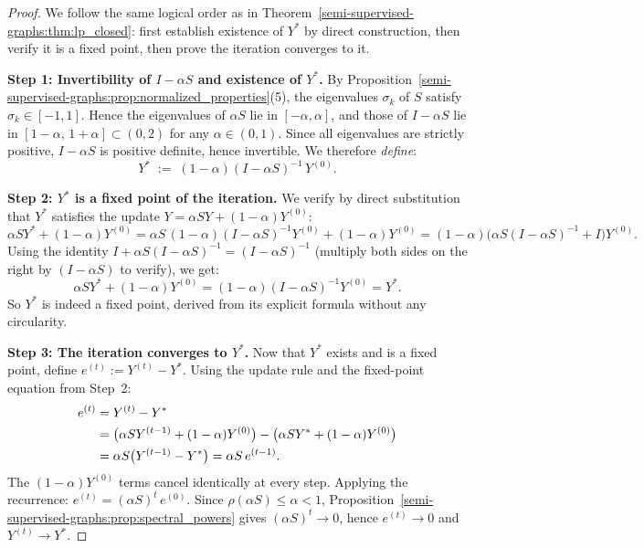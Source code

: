 \begin{notechapter}
\begin{proof}
We follow the same logical order as in Theorem~\ref{semi-supervised-graphs:thm:lp_closed}: first
establish existence of $Y^*$ by direct construction, then verify it is a fixed
point, then prove the iteration converges to it.
\vspace{0.5em}

\textbf{Step 1: Invertibility of $I - \alpha S$ and existence of $Y^*$.}
By Proposition~\ref{semi-supervised-graphs:prop:normalized_properties}(5), the eigenvalues $\sigma_k$
of $S$ satisfy $\sigma_k \in [-1, 1]$. Hence the eigenvalues of $\alpha S$ lie
in $[-\alpha, \alpha]$, and those of $I - \alpha S$ lie in
$[1-\alpha,\, 1+\alpha] \subset (0, 2)$ for any $\alpha \in (0,1)$. Since all
eigenvalues are strictly positive, $I - \alpha S$ is positive definite, hence
invertible. We therefore \emph{define}:
\[
  Y^* \;:=\; (1-\alpha)(I - \alpha S)^{-1}\,Y^{(0)}.
\]

\textbf{Step 2: $Y^*$ is a fixed point of the iteration.}
We verify by direct substitution that $Y^*$ satisfies the update
$Y = \alpha S Y + (1-\alpha)Y^{(0)}$:
\[
  \alpha S Y^* + (1-\alpha)Y^{(0)}
  = \alpha S\,(1-\alpha)(I-\alpha S)^{-1}Y^{(0)} + (1-\alpha)Y^{(0)}
  = (1-\alpha)\bigl(\alpha S(I-\alpha S)^{-1} + I\bigr)Y^{(0)}.
\]
Using the identity $I + \alpha S(I - \alpha S)^{-1} = (I - \alpha S)^{-1}$
(multiply both sides on the right by $(I - \alpha S)$ to verify), we get:
\[
  \alpha S Y^* + (1-\alpha)Y^{(0)}
  = (1-\alpha)(I - \alpha S)^{-1}Y^{(0)} = Y^*.
\]
So $Y^*$ is indeed a fixed point, derived from its explicit formula without
any circularity.

\textbf{Step 3: The iteration converges to $Y^*$.}
Now that $Y^*$ exists and is a fixed point, define $e^{(t)} := Y^{(t)} - Y^*$.
Using the update rule and the fixed-point equation from Step~2:
\begin{align}
e^{(t)} &= Y^{(t)} - Y^* \notag\\
&= \bigl(\alpha S Y^{(t-1)} + (1-\alpha)Y^{(0)}\bigr)
 - \bigl(\alpha S Y^* + (1-\alpha)Y^{(0)}\bigr) \notag\\
&= \alpha S\bigl(Y^{(t-1)} - Y^*\bigr) = \alpha S\,e^{(t-1)}.
\end{align}
The $(1-\alpha)Y^{(0)}$ terms cancel identically at every step. Applying the
recurrence: $e^{(t)} = (\alpha S)^t\,e^{(0)}$. Since $\rho(\alpha S) \leq
\alpha < 1$, Proposition~\ref{semi-supervised-graphs:prop:spectral_powers} gives $(\alpha S)^t \to 0$,
hence $e^{(t)} \to 0$ and $Y^{(t)} \to Y^*$.
\end{proof}


\end{notechapter}
